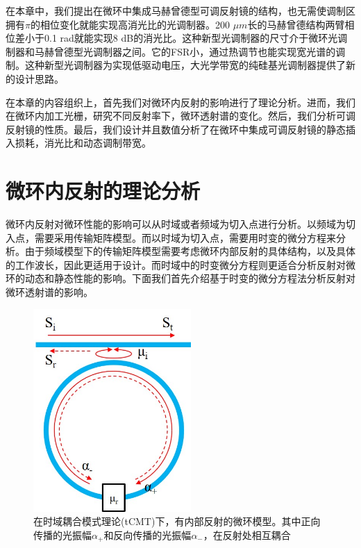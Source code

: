 在本章中，我们提出在微环中集成马赫曾德型可调反射镜的结构，也无需使调制区拥有$\pi$的相位变化就能实现高消光比的光调制器。200 $\mu m$长的马赫曾德结构两臂相位差小于0.1 rad就能实现8 dB的消光比。这种新型光调制器的尺寸介于微环光调制器和马赫曾德型光调制器之间。它的FSR小，通过热调节也能实现宽光谱的调制。这种新型光调制器为实现低驱动电压，大光学带宽的纯硅基光调制器提供了新的设计思路。

在本章的内容组织上，首先我们对微环内反射的影响进行了理论分析。进而，我们在微环内加工光栅，研究不同反射率下，微环透射谱的变化。然后，我们分析可调反射镜的性质。最后，我们设计并且数值分析了在微环中集成可调反射镜的静态插入损耗，消光比和动态调制带宽。

\section{微环内反射的理论分析}
微环内反射对微环性能的影响可以从时域或者频域为切入点进行分析。以频域为切入点，需要采用传输矩阵模型\cite{yariv2006photonics}。而以时域为切入点，需要用时变的微分方程来分析\cite{haus1984waves}。由于频域模型下的传输矩阵模型需要考虑微环内部反射的具体结构，以及具体的工作波长，因此更适用于设计。而时域中的时变微分方程则更适合分析反射对微环的动态和静态性能的影响。下面我们首先介绍基于时变的微分方程法分析反射对微环透射谱的影响\cite{haus1984waves,Li2016design,little1997microring}。
\begin{figure}[htb]
	\centering
	\includegraphics[width=6cm]{./Pictures/chapt5_ring_reflector_structure.jpg}
	\caption{在时域耦合模式理论(tCMT)下，有内部反射的微环模型。其中正向传播的光振幅$\alpha_+$和反向传播的光振幅$\alpha_-$，在反射处相互耦合}
	\label{chapt5_ring_reflector_structure}
\end{figure}

